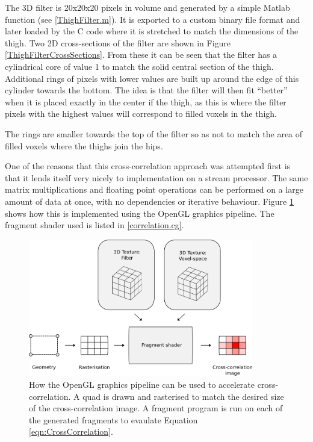 \bigskip
\noindent The 3D filter is 20x20x20 pixels in volume and generated by a simple Matlab function (see \ref{ThighFilter.m}).
It is exported to a custom binary file format and later loaded by the C code where it is stretched to match the dimensions of the thigh.
Two 2D cross-sections of the filter are shown in Figure \ref{ThighFilterCrossSections}.
From these it can be seen that the filter has a cylindrical core of value 1 to match the solid central section of the thigh.
Additional rings of pixels with lower values are built up around the edge of this cylinder towards the bottom.
The idea is that the filter will then fit ``better'' when it is placed exactly in the center if the thigh,
as this is where the filter pixels with the highest values will correspond to filled voxels in the thigh.

The rings are smaller towards the top of the filter so as not to match the area of filled voxels where the thighs join the hips.

\bigskip
\noindent One of the reasons that this cross-correlation approach was attempted first is that it lends itself very nicely to implementation on a stream processor.
The same matrix multiplications and floating point operations can be performed on a large amount of data at once, with no dependencies or iterative behaviour.
Figure \ref{CrossCorrelation} shows how this is implemented using the OpenGL graphics pipeline.
The fragment shader used is listed in \ref{correlation.cg}.

\begin{figure}[tb]
	\vspace{-10pt}
	\centering
	\includegraphics[height=6cm]{correlation.png}
	\caption{How the OpenGL graphics pipeline can be used to accelerate cross-correlation.
		A quad is drawn and rasterised to match the desired size of the cross-correlation image.
		A fragment program is run on each of the generated fragments to evaulate Equation \ref{eqn:CrossCorrelation}.}
	\label{CrossCorrelation}
\end{figure}

